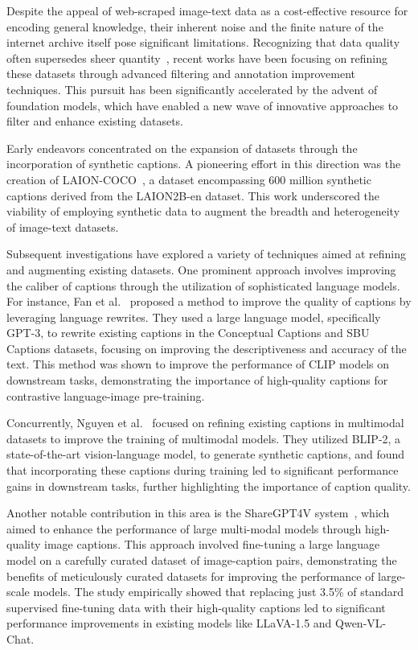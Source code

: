 Despite the appeal of web-scraped image-text data as a cost-effective resource for encoding general knowledge, their inherent noise and the finite nature of the internet archive itself pose significant limitations. Recognizing that data quality often supersedes sheer quantity~\cite{birhane2024into}, recent works have been focusing on refining these datasets through advanced filtering and annotation improvement techniques. This pursuit has been significantly accelerated by the advent of foundation models, which have enabled a new wave of innovative approaches to filter and enhance existing datasets.
 
Early endeavors concentrated on the expansion of datasets through the incorporation of synthetic captions. A pioneering effort in this direction was the creation of LAION-COCO~\cite{laioncoco}, a dataset encompassing 600 million synthetic captions derived from the LAION2B-en dataset. This work underscored the viability of employing synthetic data to augment the breadth and heterogeneity of image-text datasets.

Subsequent investigations have explored a variety of techniques aimed at refining and augmenting existing datasets. One prominent approach involves improving the caliber of captions through the utilization of sophisticated language models. For instance, Fan et al.~\cite{fan2024improving} proposed a method to improve the quality of captions by leveraging language rewrites. They used a large language model, specifically GPT-3, to rewrite existing captions in the Conceptual Captions and SBU Captions datasets, focusing on improving the descriptiveness and accuracy of the text. This method was shown to improve the performance of CLIP models on downstream tasks, demonstrating the importance of high-quality captions for contrastive language-image pre-training.

Concurrently, Nguyen et al.~\cite{nguyen2024improving} focused on refining existing captions in multimodal datasets to improve the training of multimodal models. They utilized BLIP-2, a state-of-the-art vision-language model, to generate synthetic captions, and found that incorporating these captions during training led to significant performance gains in downstream tasks, further highlighting the importance of caption quality.

Another notable contribution in this area is the ShareGPT4V system~\cite{chen2025sharegpt4v}, which aimed to enhance the performance of large multi-modal models through high-quality image captions. This approach involved fine-tuning a large language model on a carefully curated dataset of image-caption pairs, demonstrating the benefits of meticulously curated datasets for improving the performance of large-scale models. The study empirically showed that replacing just 3.5\% of standard supervised fine-tuning data with their high-quality captions led to significant performance improvements in existing models like LLaVA-1.5 and Qwen-VL-Chat.

